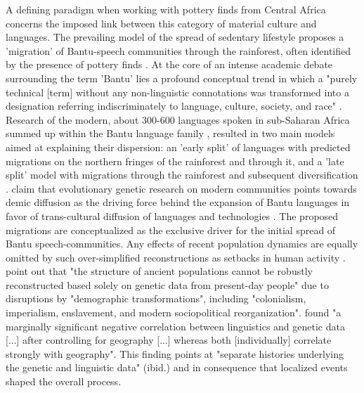 \documentclass[smallextended,natbib]{svjour3}       %
\begin{document}
A defining paradigm when working with pottery finds from Central Africa concerns the imposed link between this category of material culture and languages. The prevailing model of the spread of sedentary lifestyle proposes a 'migration' of Bantu-speech communities through the rainforest, often identified by the presence of pottery finds \citep{Currie.2013,Bostoen.2015,Grollemund.2015,Koile.2022,Grollemund.2023}. At the core of an intense academic debate surrounding the term 'Bantu' \citep[cf.][]{Oliver.1966,Vansina.1979,Vansina.1980,Robertson.2000,Eggert.2005,Eggert.2016a} lies a profound conceptual trend in which a "purely technical [term] without any non-linguistic connotations was transformed into a designation referring indiscriminately to language, culture, society, and race" \citep[302]{Eggert.2005}. Research of the modern, about 300-600 languages spoken in sub-Saharan Africa summed up within the Bantu language family \citep{Nurse.2003,Bostoen.2018}, resulted in two main models aimed at explaining their dispersion: an 'early split' of languages with predicted migrations on the northern fringes of the rainforest and through it, and a 'late split' model with migrations through the rainforest and subsequent diversification \citep{Bostoen.2018,Bostoen.2020}. \citet{Pakendorf.2011} claim that evolutionary genetic research on modern communities points towards demic diffusion as the driving force behind the expansion of Bantu languages in favor of trans-cultural diffusion of languages and technologies \citep{Bostoen.2022}. The proposed migrations are conceptualized as the exclusive driver for the initial spread of Bantu speech-communities. Any effects of recent population dynamics \citep[cf.][83]{Vennetier.1963} are equally omitted by such over-simplified reconstructions as setbacks in human activity \citep{Oslisly.1998,Oslisly.2013b,Saulieu.2017,deSaulieu.2021a,Seidensticker.2021}. \citet[1]{Lipson.2022} point out that "the structure of ancient populations cannot be robustly reconstructed based solely on genetic data from present-day people" due to disruptions by "demographic transformations", including "colonialism, imperialism, enslavement, and modern sociopolitical reorganization". \citet[7]{Fortes-Lima.2023a} found "a marginally significant negative correlation between linguistics and genetic data [...] after controlling for geography [...] whereas both [individually] correlate strongly with geography". This finding points at "separate histories underlying the genetic and linguistic data" (ibid.) and in consequence that localized events shaped the overall process.
\end{document}
